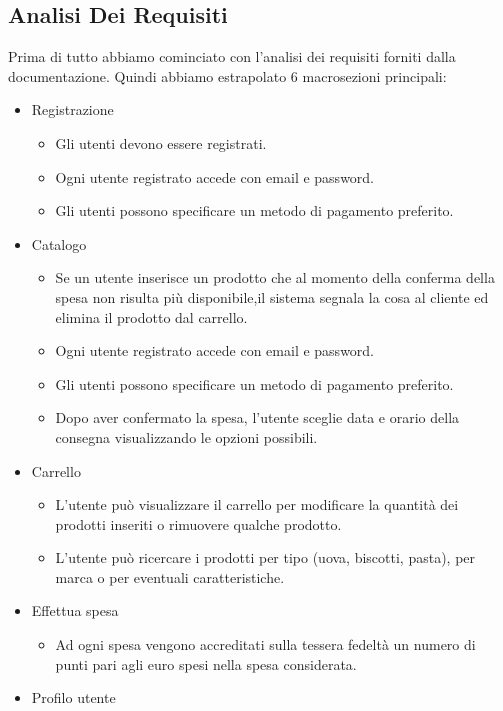 \documentclass[12pt, a4paper]{article}
\begin{document}
\subsection{Analisi Dei Requisiti}
Prima di tutto abbiamo cominciato con l'analisi dei requisiti forniti dalla documentazione. Quindi abbiamo estrapolato 6 macrosezioni principali:
\begin{itemize}
\item Registrazione
	\begin{itemize}
	\item Gli  utenti devono  essere  registrati.
	\item Ogni utente registrato accede con email e password.
	\item Gli utenti possono specificare un metodo di pagamento preferito.
	\end{itemize}
\item Catalogo
	\begin{itemize}
	\item  Se un utente inserisce un prodotto che al momento della conferma della spesa non risulta più disponibile,il sistema segnala la cosa al cliente ed elimina il prodotto dal carrello.
	\item Ogni utente registrato accede con email e password.
	\item Gli utenti possono specificare un metodo di pagamento preferito.
	\item Dopo aver confermato la spesa, l’utente sceglie data e orario della consegna visualizzando le opzioni possibili.
	\end{itemize}
\item Carrello
	\begin{itemize}
	\item L’utente può visualizzare il carrello per modificare la quantità dei prodotti inseriti o rimuovere qualche prodotto.
	\item L’utente può ricercare i prodotti per tipo (uova, biscotti, pasta), per marca o per eventuali caratteristiche.
	\end{itemize}
\item Effettua spesa
	\begin{itemize}
	\item  Ad ogni spesa vengono accreditati sulla tessera fedeltà un numero di punti pari agli euro spesi nella spesa considerata.
	\end{itemize}
\item Profilo utente

\end{itemize}
\end{document}
